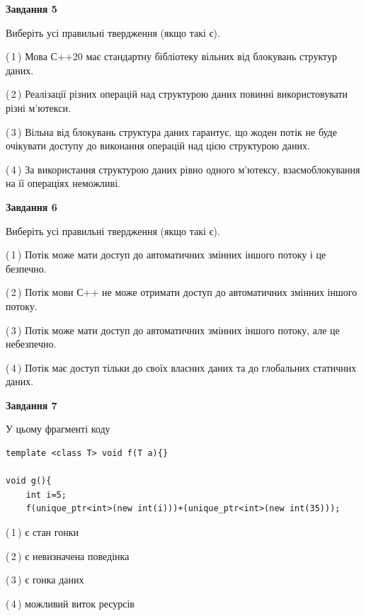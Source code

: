 \documentclass[12pt, ukrainian]{article}
\begin{document}
\begin {large}
{\begin{center}
\textbf{Завдання 5}
\end{center}

Виберіть усі правильні твердження (якщо такі є).\par
\vspace{2mm}

(\,1\,) Мова С++20 має стандартну бібліотеку вільних від блокувань структур даних.%

(\,2\,) Реалізації різних операцій над структурою даних повинні використовувати різні м’ютекси.%

(\,3\,) Вільна від блокувань структура даних гарантує, що жоден потік не буде очікувати доступу до виконання операцій над цією структурою даних.%

(\,4\,) За використання структурою даних рівно одного м’ютексу, взаємоблокування на її операціях неможливі.%
\newpage


\begin{center}
\textbf{Завдання 6}
\end{center}

Виберіть усі правильні твердження (якщо такі є).\par
\vspace{2mm}

(\,1\,) Потік може мати доступ до автоматичних змінних іншого потоку і це безпечно.%

(\,2\,) Потік мови С++ не може отримати доступ до автоматичних змінних іншого потоку.%

(\,3\,) Потік може мати доступ до автоматичних змінних іншого потоку, але це небезпечно.%

(\,4\,) Потік має доступ тільки до своїх власних даних та до глобальних статичних даних.%


\begin{center}
\textbf{Завдання 7}
\end{center}

У цьому фрагменті коду
\begin{verbatim}
template <class T> void f(T a){}

void g(){
    int i=5;
    f(unique_ptr<int>(new int(i)))+(unique_ptr<int>(new int(35)));
\end{verbatim}
(\,1\,) є стан гонки%

(\,2\,) є невизначена поведінка%

(\,3\,) є гонка даних%

(\,4\,) можливий виток ресурсів%

}
\end {large}

\vspace{4mm}
\newpage
\end{document}
